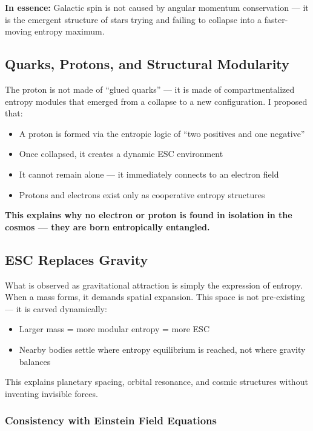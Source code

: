 \documentclass[12pt]{article}
\begin{document}
\noindent
\textbf{In essence:} Galactic spin is not caused by angular momentum conservation — it is the emergent structure of stars trying and failing to collapse into a faster-moving entropy maximum.

\subsection{Quarks, Protons, and Structural Modularity}

The proton is not made of ``glued quarks'' — it is made of compartmentalized entropy modules that emerged from a collapse to a new configuration. I proposed that:
\begin{itemize}
    \item A proton is formed via the entropic logic of ``two positives and one negative''
    \item Once collapsed, it creates a dynamic ESC environment
    \item It cannot remain alone — it immediately connects to an electron field
    \item Protons and electrons exist only as cooperative entropy structures
\end{itemize}

\noindent
\textbf{This explains why no electron or proton is found in isolation in the cosmos — they are born entropically entangled.}

\subsection{ESC Replaces Gravity}

What is observed as gravitational attraction is simply the expression of entropy. When a mass forms, it demands spatial expansion. This space is not pre-existing — it is carved dynamically:
\begin{itemize}
    \item Larger mass = more modular entropy = more ESC
    \item Nearby bodies settle where entropy equilibrium is reached, not where gravity balances
\end{itemize}

This explains planetary spacing, orbital resonance, and cosmic structures without inventing invisible forces.

\subsubsection*{Consistency with Einstein Field Equations}
\end{document}
